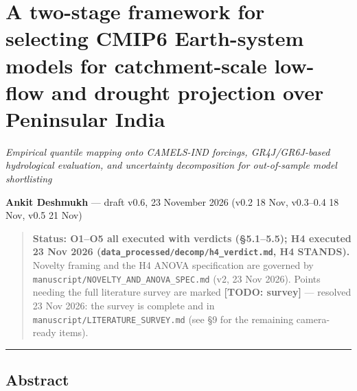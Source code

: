 \documentclass[
  english,
  11pt,
]{article}
\author{}
\date{}
\begin{document}
\section{A two-stage framework for selecting CMIP6 Earth-system models
for catchment-scale low-flow and drought projection over Peninsular
India}\label{a-two-stage-framework-for-selecting-cmip6-earth-system-models-for-catchment-scale-low-flow-and-drought-projection-over-peninsular-india}

\emph{Empirical quantile mapping onto CAMELS-IND forcings,
GR4J/GR6J-based hydrological evaluation, and uncertainty decomposition
for out-of-sample model shortlisting}

\textbf{Ankit Deshmukh} --- draft v0.6, 23 November 2026 (v0.2 18 Nov,
v0.3--0.4 18 Nov, v0.5 21 Nov)

\begin{quote}
\textbf{Status: O1--O5 all executed with verdicts (§5.1--5.5); H4
executed 23 Nov 2026 (\texttt{data\_processed/decomp/h4\_verdict.md}, H4
STANDS).} Novelty framing and the H4 ANOVA specification are governed by
\texttt{manuscript/NOVELTY\_AND\_ANOVA\_SPEC.md} (v2, 23 Nov 2026).
Points needing the full literature survey are marked \textbf{{[}TODO:
survey{]}} --- resolved 23 Nov 2026: the survey is complete and in
\texttt{manuscript/LITERATURE\_SURVEY.md} (see §9 for the remaining
camera-ready items).
\end{quote}

\begin{center}\rule{0.5\linewidth}{0.5pt}\end{center}

\subsection{Abstract}\label{abstract}
\end{document}
